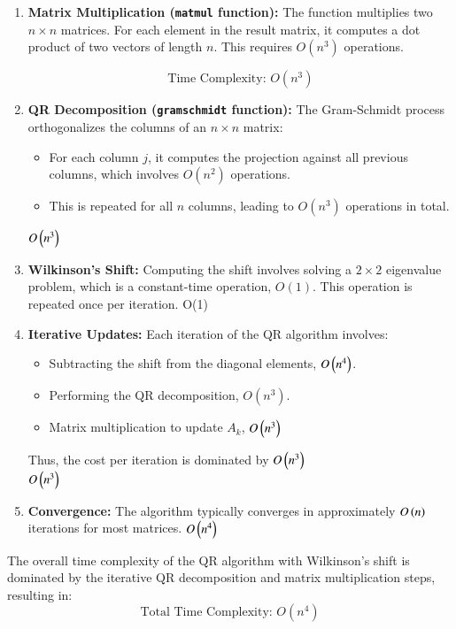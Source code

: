 \documentclass[journal]{IEEEtran}
\begin{document}
\begin{enumerate}
    \item \textbf{Matrix Multiplication (\texttt{matmul} function):} 
    The function multiplies two $n \times n$ matrices. For each element in the result matrix, it computes a dot product of two vectors of length $n$. This requires $O(n^3)$ operations.

    \[
    \text{Time Complexity: } O(n^3)
    \]

    \item \textbf{QR Decomposition (\texttt{gramschmidt} function):} 
    The Gram-Schmidt process orthogonalizes the columns of an $n \times n$ matrix:
    \begin{itemize}
        \item For each column $j$, it computes the projection against all previous columns, which involves $O(n^2)$ operations.
        \item This is repeated for all $n$ columns, leading to $O(n^3)$ operations in total.
    \end{itemize}
     $O\left(n^3\right)$
    \item \textbf{Wilkinson's Shift:} 
    Computing the shift involves solving a $2 \times 2$ eigenvalue problem, which is a constant-time operation, $O(1)$. This operation is repeated once per iteration.
     O(1)
    \item \textbf{Iterative Updates:} 
    Each iteration of the QR algorithm involves:
    \begin{itemize}
        \item Subtracting the shift from the diagonal elements, $O\left(n^4\right)$.
        \item Performing the QR decomposition, $O(n^3)$.
        \item Matrix multiplication to update $A_k$, $O\left(n^3\right)$
    \end{itemize}
    Thus, the cost per iteration is dominated by $O\left(n^3\right)$\\
     $O\left(n^3\right)$
    \item \textbf{Convergence:} 
    The algorithm typically converges in approximately $O\left(n\right)$ iterations for most matrices.
     $O\left(n^4\right)$

\end{enumerate}
The overall time complexity of the QR algorithm with Wilkinson's shift is dominated by the iterative QR decomposition and matrix multiplication steps, resulting in:
\[
\text{Total Time Complexity: } O(n^4)
\]
\end{document}
